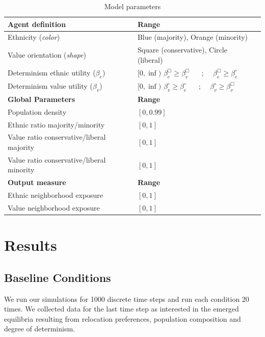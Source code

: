 \documentclass[
]{article}
\begin{document}
\begin{table}[H]

\begin{tabular}{lll}
 \hline
\textbf{Agent definition}  & \textbf{Range}    \\ 
 \hline
 Ethnicity  (\textit{color})         & Blue (majority), Orange (minority)  \\
 Value orientation (\textit{shape}) & Square (conservative), Circle (liberal) \\
 Determinism ethnic utility ($\beta_e$) & $[0,\inf)$ 
 $\beta^{\Box}_e \geq \beta^{\Box}_v$
 $\quad\text{   ;    }\quad \beta^{\Box}_e \geq \beta^{\circ}_e$
 \\
 Determinism value utility ($\beta_v$) & $[0,\inf)$ $\beta^{\circ}_v \geq \beta^{\circ}_e$
 $\quad\text{   ;    }\quad \beta^{\circ}_v \geq \beta^{\Box}_v$\\
 \hline
\textbf{Global Parameters}  & \textbf{Range} \\ 
\hline 
 Population density      & $[0,0.99]$ \\
 Ethnic ratio majority/minority &  $[0,1]$ \\
 Value ratio conservative/liberal majority & $[0,1]$ \\
 Value ratio conservative/liberal minority  & $[0,1]$ \\
 \hline
 \textbf{Output measure}  & \textbf{Range} \\ 
\hline 
 Ethnic neighborhood exposure      & $[0,1]$ \\
 Value neighborhood exposure       & $[0,1]$ \\
 \hline
\end{tabular}
 \caption{Model parameters} 
 \label{tab:parameters}
\end{table}

\hypertarget{results}{%
\section{Results}\label{results}}

\hypertarget{baseline-conditions}{%
\subsection{Baseline Conditions}\label{baseline-conditions}}

We run our simulations for 1000 discrete time steps and run each
condition 20 times. We collected data for the last time step as
interested in the emerged equilibria resulting from relocation
preferences, population composition and degree of determinism.
\end{document}
